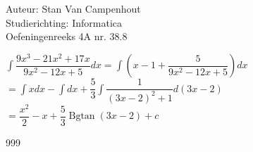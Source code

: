 \documentclass[a4paper]{article}
\begin{document}
  
\noindent \large Auteur: Stan Van Campenhout \\
\noindent \large Studierichting:  Informatica\\
\noindent \large Oefeningenreeks 4A nr. 38.8\\

\medskip

\normalsize

$ \displaystyle\int\dfrac{9x^3 - 21x^2 + 17x}{9x^2 - 12x + 5}dx = \displaystyle\int\left(x - 1 + \dfrac{5}{9x^2 - 12x + 5}\right)dx $\\

$ = \displaystyle\int xdx - \displaystyle\int dx + \dfrac{5}{3}\displaystyle\int\dfrac{1}{\left(3x - 2\right)^2 + 1}d\left(3x - 2\right) $\\

$ = \dfrac{x^2}{2} - x + \dfrac{5}{3}\operatorname{Bgtan}\left(3x-2\right) + c $\\

\begin{thebibliography}{999}
\end{thebibliography}
\end{document}
